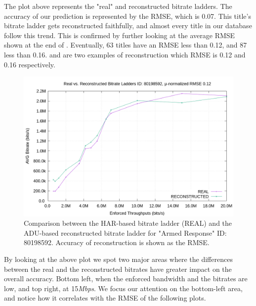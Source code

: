 The plot above represents the "real" and reconstructed bitrate ladders.  The
accuracy of our prediction is represented by the RMSE, which is 0.07.  This
title's bitrate ladder gets reconstructed faithfully, and almost every title in
our database follow this trend. This is confirmed by further looking at the
average RMSE shown at the end of . Eventually,
63 titles have an RMSE less than 0.12, and 87 less than 0.16.
 and  are two
examples of reconstruction which RMSE is 0.12 and 0.16 respectively.

\begin{figure}[H]
  \centering
  \includegraphics[width=\columnwidth]{img/80198592}
  \caption{Comparison between the HAR-based bitrate ladder (REAL) and the
  ADU-based reconstructed bitrate ladder for "Armed Response" ID: 80198592.
  Accuracy of reconstruction is shown as the RMSE.}
  \label{fig:bl_comparison_good_1}
\end{figure}

By looking at the above plot we spot two major areas where the differences
between the real and the reconstructed bitrates have greater impact on the
overall accuracy. Bottom left, when the enforced bandwidth and the bitrates are
low, and top right, at 15\emph{Mbps}. We focus our attention on the bottom-left
area, and notice how it correlates with the RMSE of the following plots.

